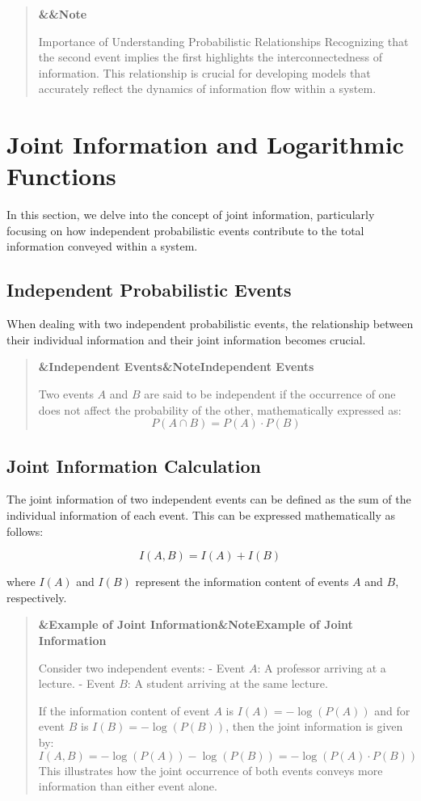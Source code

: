 \documentclass[a4paper]{article}
\newcommand{\boxheading}[1]{%
  \par\smallskip
  \noindent\textbf{\ifx&#1&Note\else#1\fi}\par
  \smallskip
}
\newenvironment{defbox}[1][]{%
  \begin{quote}\color{green!40!black}\boxheading{#1}\normalcolor
}{\end{quote}}
\newenvironment{exbox}[1][]{%
  \begin{quote}\color{brown!70!black}\boxheading{#1}\normalcolor
}{\end{quote}}
\newenvironment{rembox}[1][]{%
  \begin{quote}\color{black!70}\boxheading{#1}\normalcolor
}{\end{quote}}
\begin{document}
\begin{rembox}{Importance of Understanding Probabilistic Relationships}
Recognizing that the second event implies the first highlights the interconnectedness of information. This relationship is crucial for developing models that accurately reflect the dynamics of information flow within a system.
\end{rembox}

\section{Joint Information and Logarithmic Functions}
In this section, we delve into the concept of joint information, particularly focusing on how independent probabilistic events contribute to the total information conveyed within a system.

\subsection{Independent Probabilistic Events}
When dealing with two independent probabilistic events, the relationship between their individual information and their joint information becomes crucial. 

\begin{defbox}[Independent Events]
Two events \( A \) and \( B \) are said to be independent if the occurrence of one does not affect the probability of the other, mathematically expressed as:
\[
P(A \cap B) = P(A) \cdot P(B)
\]
\end{defbox}

\subsection{Joint Information Calculation}
The joint information of two independent events can be defined as the sum of the individual information of each event. This can be expressed mathematically as follows:

\begin{equation}
I(A, B) = I(A) + I(B)
\end{equation}

where \( I(A) \) and \( I(B) \) represent the information content of events \( A \) and \( B \), respectively.

\begin{exbox}[Example of Joint Information]
Consider two independent events:
- Event \( A \): A professor arriving at a lecture.
- Event \( B \): A student arriving at the same lecture.

If the information content of event \( A \) is \( I(A) = -\log(P(A)) \) and for event \( B \) is \( I(B) = -\log(P(B)) \), then the joint information is given by:
\[
I(A, B) = -\log(P(A)) - \log(P(B)) = -\log(P(A) \cdot P(B))
\]
This illustrates how the joint occurrence of both events conveys more information than either event alone.
\end{exbox}
\end{document}
